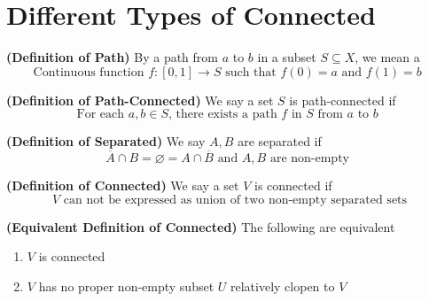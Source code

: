 \documentclass{report}
\begin{document}
\section{Different Types of Connected}
\begin{definition}
\label{2.3.1}
  \textbf{(Definition of Path)} By a path from $a$ to  $b$ in a subset $S\subseteq X$, we mean a
  \begin{equation*}
  \text{ Continuous function $f:[0,1]\rightarrow S$ such that $f(0)=a$ and $f(1)=b$ }
  \end{equation*}
\end{definition}
\begin{definition}
\label{2.3.2}
\textbf{(Definition of Path-Connected)} We say a set $S$ is path-connected if 
\begin{equation*}
\text{ For each $a,b\in S$, there exists a path $f$ in $S$ from $a$ to $b$ }
\end{equation*}
\end{definition}
\begin{definition}
\label{2.3.3}
\textbf{(Definition of Separated)} We say $A,B$ are separated if 
\begin{equation*}
\overline{A}\cap B=\varnothing=A\cap \overline{B}\text{ and }A,B\text{ are non-empty }
\end{equation*}
\end{definition}
\begin{definition}
\label{2.3.4}
\textbf{(Definition of Connected)} We say a set $V$ is connected if 
 \begin{equation*}
V\text{ can not be expressed as union of  two non-empty separated sets}
\end{equation*}
\end{definition}
\begin{theorem}
\label{2.3.5}
\textbf{(Equivalent Definition of Connected)} The following are equivalent
\begin{enumerate}[label=(\alph*)]
  \item $V$ is connected
  \item $V$ has no proper non-empty subset  $U$ relatively clopen to  $V$
\end{enumerate}
\end{theorem}
\end{document}
